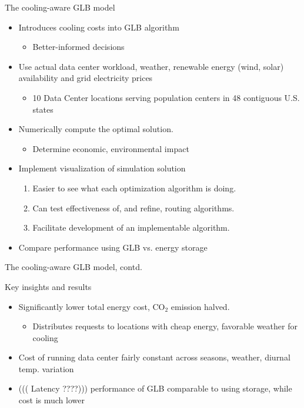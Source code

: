 \documentclass[xcolor=dvipsnames]{beamer}
\newcommand{\carbondioxide}{\ensuremath{\mathrm{CO}_2}}
\begin{document}
\begin{frame}{The cooling-aware GLB model}

		\begin{itemize}
			\item{Introduces cooling costs into GLB algorithm}
			\begin{itemize}
				\item Better-informed decisions  
			\end{itemize}
			\item{Use actual data center workload, weather, renewable energy (wind, solar) availability and grid electricity prices}
			\begin{itemize}
				\item {10 Data Center locations serving population centers in 48 contiguous U.S. states}		
			\end{itemize}
			\item{Numerically compute the optimal solution.}
			\begin{itemize}
				\item Determine economic, environmental impact
			\end{itemize}
			\item{Implement visualization of simulation solution \\
				\begin{enumerate}
					\item{Easier to see what each optimization algorithm is doing.}
					\item{Can test effectiveness of, and refine, routing algorithms.} 
					\item{Facilitate development of an implementable algorithm.}
				\end{enumerate}
				}			
			\item Compare performance using GLB vs. energy storage			
		\end{itemize}

\end{frame}

\begin{frame}{The cooling-aware GLB model, contd.}

	\begin{block}{Key insights and results}
	\begin{itemize}
		\item{Significantly lower total energy cost, \carbondioxide{} emission halved.}  %
		\begin{itemize}
			\item Distributes requests to locations with cheap energy, favorable weather for cooling  %
		\end{itemize}
		\item{Cost of running data center fairly constant across seasons, weather, diurnal temp. variation}  
		\item {((( Latency ????))) performance of GLB comparable to using storage, while cost is much lower}
	\end{itemize}
	\end{block}

\end{frame}
\end{document}
